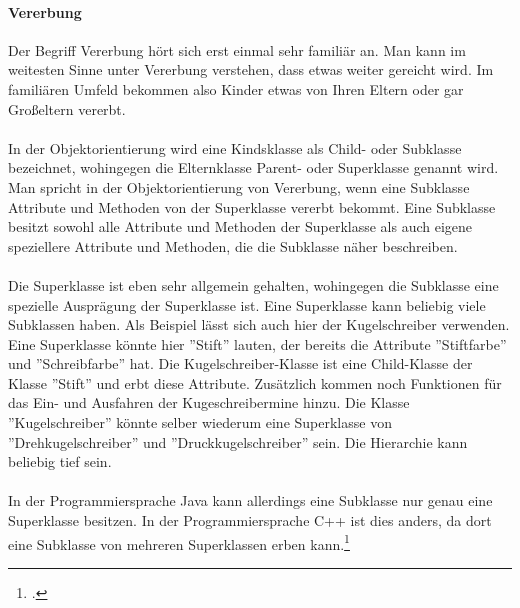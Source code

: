  \paragraph{Vererbung}
Der Begriff Vererbung hört sich erst einmal sehr familiär an. Man kann im weitesten Sinne unter Vererbung verstehen, dass etwas weiter gereicht wird. Im familiären Umfeld bekommen also Kinder etwas von Ihren Eltern oder gar Großeltern vererbt.\\
\\
In der Objektorientierung wird eine Kindsklasse als Child- oder Subklasse bezeichnet, wohingegen die Elternklasse Parent- oder Superklasse genannt wird. Man spricht in der Objektorientierung von Vererbung, wenn eine Subklasse Attribute und Methoden von der Superklasse vererbt bekommt. Eine Subklasse besitzt sowohl alle Attribute und Methoden der Superklasse als auch eigene speziellere Attribute und Methoden, die die Subklasse näher beschreiben.\\
\\
Die Superklasse ist eben sehr allgemein gehalten, wohingegen die Subklasse eine spezielle Ausprägung der Superklasse ist. Eine Superklasse kann beliebig viele Subklassen haben. Als Beispiel lässt sich auch hier der Kugelschreiber verwenden. Eine Superklasse könnte hier ''Stift'' lauten, der bereits die Attribute ''Stiftfarbe'' und ''Schreibfarbe'' hat. Die Kugelschreiber-Klasse ist eine Child-Klasse der Klasse ''Stift'' und erbt diese Attribute. Zusätzlich kommen noch Funktionen für das Ein- und Ausfahren der Kugeschreibermine hinzu. Die Klasse ''Kugelschreiber'' könnte selber wiederum eine Superklasse von ''Drehkugelschreiber'' und ''Druckkugelschreiber'' sein. Die Hierarchie kann beliebig tief sein.\\
\\
In der Programmiersprache Java kann allerdings eine Subklasse nur genau eine Superklasse besitzen. In der Programmiersprache C++ ist dies anders, da dort eine Subklasse von mehreren Superklassen erben kann.\footcite{shit_java_tut}

